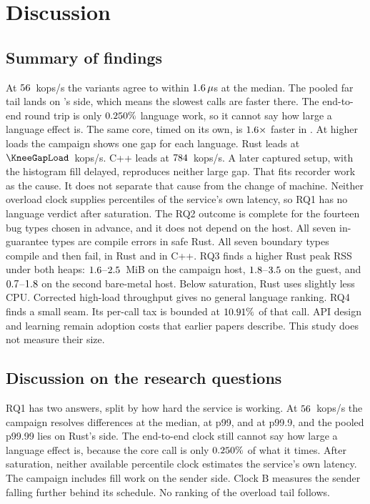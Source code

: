 \documentclass[english,oneside,a4paper,censored,csm,software-track-2020]{HYthesisML}
\begin{document}
\chapter{Discussion\label{chapter:discussion}}

\section{Summary of findings}
At $56$~kops/s the variants agree to within $1.6\,\mu$s at the median.
The pooled far tail lands on \FarTailLower{}'s side, which means the slowest calls are faster there.
The end-to-end round trip is only $0.250\%$ language work, so it cannot say how large a language effect is.
The same core, timed on its own, is $1.6\times$ faster in \BudgetCoreFaster{}.
At higher loads the campaign shows one gap for each language.
Rust leads at $\KneeGapLoad$~kops/s. C++ leads at $784$~kops/s.
A later captured setup, with the histogram fill delayed, reproduces neither large gap.
That fits recorder work as the cause. It does not separate that cause from the change of machine.
Neither overload clock supplies percentiles of the service's own latency, so RQ1 has no language verdict after saturation.
The RQ2 outcome is complete for the fourteen bug types chosen in advance, and it does not depend on the host.
All seven in-guarantee types are compile errors in safe Rust.
All seven boundary types compile and then fail, in Rust and in C++.
RQ3 finds a higher Rust peak RSS under both heaps: $1.6$--$2.5$~MiB on the campaign host, $1.8$--$3.5$ on the guest, and $0.7$--$1.8$ on the second bare-metal host.
Below saturation, Rust uses slightly less CPU.
Corrected high-load throughput gives no general language ranking.
RQ4 finds a small seam. Its per-call tax is bounded at $10.91\%$ of that call.
API design and learning remain adoption costs that earlier papers describe. This study does not measure their size.

\section{Discussion on the research questions}\label{sec:rqdiscussion}
RQ1 has two answers, split by how hard the service is working.
At $56$~kops/s the campaign resolves differences at the median, at p99, and at p99.9, and the pooled p99.99 lies on Rust's side.
The end-to-end clock still cannot say how large a language effect is, because the core call is only $0.250\%$ of what it times.
After saturation, neither available percentile clock estimates the service's own latency.
The campaign includes fill work on the sender side. Clock B measures the sender falling further behind its schedule.
No ranking of the overload tail follows.
\end{document}

